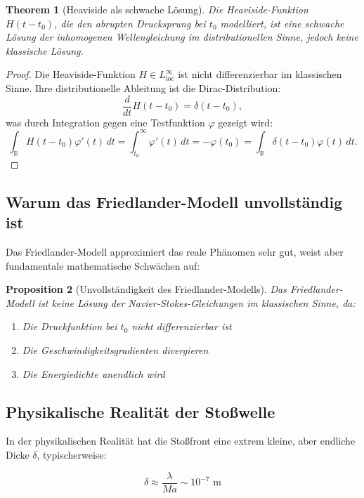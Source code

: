 ﻿\documentclass[12pt,a4paper]{article}
\newtheorem{theorem}{Theorem}[section]
\newtheorem{proposition}[theorem]{Proposition}
\theoremstyle{definition}
\theoremstyle{remark}
\begin{document}
\begin{theorem}[Heaviside als schwache Lösung]
\label{thm:heaviside_schwach}
Die Heaviside-Funktion $H(t-t_0)$, die den abrupten Drucksprung bei $t_0$ modelliert, ist eine schwache Lösung der inhomogenen Wellengleichung im distributionellen Sinne, jedoch keine klassische Lösung.
\end{theorem}
\begin{proof}
Die Heaviside-Funktion $H \in L^\infty_{\text{loc}}$ ist nicht differenzierbar im klassischen Sinne. Ihre distributionelle Ableitung ist die Dirac-Distribution:
\[
\frac{d}{dt}H(t-t_0) = \delta(t-t_0),
\]
was durch Integration gegen eine Testfunktion $\varphi$ gezeigt wird:
\[
\int_\mathbb{R} H(t-t_0)\varphi'(t)\,dt = \int_{t_0}^\infty \varphi'(t)\,dt = -\varphi(t_0) = \int_\mathbb{R} \delta(t-t_0)\varphi(t)\,dt. 
\]
\end{proof}

\subsection{Warum das Friedlander-Modell unvollständig ist}

Das Friedlander-Modell approximiert das reale Phänomen sehr gut, weist aber fundamentale mathematische Schwächen auf:

\begin{proposition}[Unvollständigkeit des Friedlander-Modells]
Das Friedlander-Modell ist keine Lösung der Navier-Stokes-Gleichungen im klassischen Sinne, da:
\begin{enumerate}
\item Die Druckfunktion bei $t_0$ nicht differenzierbar ist
\item Die Geschwindigkeitsgradienten divergieren
\item Die Energiedichte unendlich wird
\end{enumerate}
\end{proposition}

\subsection{Physikalische Realität der Stoßwelle}

In der physikalischen Realität hat die Stoßfront eine extrem kleine, aber endliche Dicke $\delta$, typischerweise:

\begin{equation}
\delta \approx \frac{\lambda}{Ma} \sim 10^{-7} \text{ m}
\end{equation}
\end{document}

